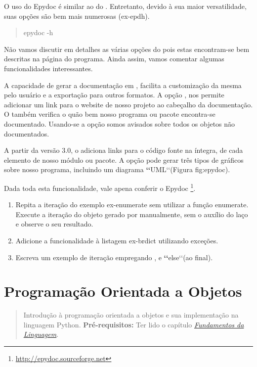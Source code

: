 \documentclass[a4paper,10pt,brazil]{sphinxmanual}
\begin{document}
O uso do Epydoc é similar ao do . Entretanto, devido à sua
maior versatilidade, suas opções são bem mais numerosas (ex-epdh).
\begin{quote}

epydoc -h
\end{quote}

Não vamos discutir em detalhes as várias opções do  pois
estas encontram-se bem descritas na página  do programa.
Ainda assim, vamos comentar algumas funcionalidades interessantes.

A capacidade de gerar a documentação em , facilita a customização
da mesma pelo usuário e a exportação para outros formatos. A opção
, nos permite adicionar um link para o website de nosso
projeto ao cabeçalho da documentação. O  também verifica
o quão bem nosso programa ou pacote encontra-se documentado.
Usando-se a opção  somos avisados sobre todos os objetos
não documentados.

A partir da versão 3.0, o  adiciona links para o código
fonte na íntegra, de cada elemento de nosso módulo ou pacote. A
opção  pode gerar três tipos de gráficos sobre nosso
programa, incluindo um diagrama {\color{red}\bfseries{}{}`{}`}UML{}`{}`(Figura fig:epydoc).

Dada toda esta funcionalidade, vale apena conferir o Epydoc \footnote{
\href{http://epydoc.sourceforge.net}{http://epydoc.sourceforge.net}
}.
\begin{enumerate}
\item {} 
Repita a iteração do exemplo ex-enumerate sem utilizar a função
enumerate. Execute a iteração do objeto gerado por 
manualmente, sem o auxílio do laço  e observe o seu
resultado.

\item {} 
Adicione a funcionalidade  à listagem ex-brdict utilizando
exceções.

\item {} 
Escreva um exemplo de iteração empregando ,  e
{\color{red}\bfseries{}{}`{}`}else{}`{}`(ao final).

\end{enumerate}


\chapter{Programação Orientada a Objetos}
\label{CapObj:cap-obj}\label{CapObj::doc}\label{CapObj:programacao-orientada-a-objetos}\begin{quote}

Introdução à programação orientada a objetos e sua implementação na linguagem Python. \textbf{Pré-requisitos:} Ter lido o capítulo {\hyperref[Cap2:cap-fundamentos]{\emph{Fundamentos da Linguagem}}}.
\end{quote}
\end{document}
